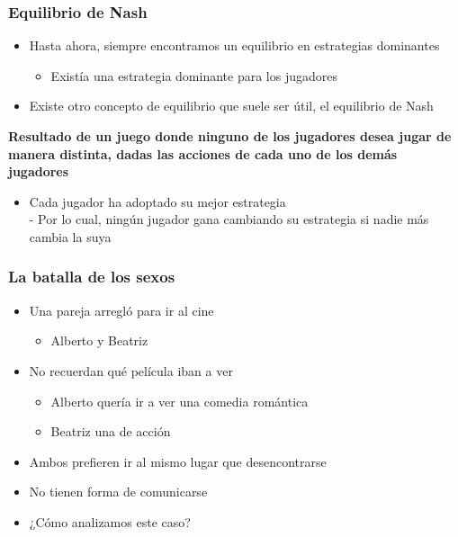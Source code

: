 \documentclass{beamer}
\begin{document}
\begin{frame}
\frametitle{Equilibrio de Nash}
\begin{itemize}
        \item Hasta ahora, siempre encontramos un equilibrio en estrategias dominantes
        \begin{itemize}
            \item Existía una estrategia dominante para los jugadores
        \end{itemize}
        \item Existe otro concepto de equilibrio que suele ser útil, el equilibrio de Nash
        \end{itemize}
\textbf{Resultado de un juego donde ninguno de los jugadores desea jugar de manera distinta, dadas las acciones de cada uno de los demás jugadores} \vspace{2mm}
\begin{itemize}
        \begin{itemize}
            \item Cada jugador ha adoptado su mejor estrategia \\
            - Por lo cual, ningún jugador gana cambiando su estrategia si nadie más cambia la suya
        \end{itemize}
        \end{itemize}
\end{frame}

\begin{frame}
\frametitle{ La batalla de los sexos}
\begin{itemize}
        \item Una pareja arregló para ir al cine
        \begin{itemize}
            \item Alberto y Beatriz
        \end{itemize}
        \item No recuerdan qué película iban a ver
        \begin{itemize}
            \item Alberto quería ir a ver una comedia romántica
            \item Beatriz una de acción
        \end{itemize}
        \item Ambos prefieren ir al mismo lugar que desencontrarse
        \item No tienen forma de comunicarse
        \item ¿Cómo analizamos este caso?
\end{itemize}
\end{frame}
\end{document}
